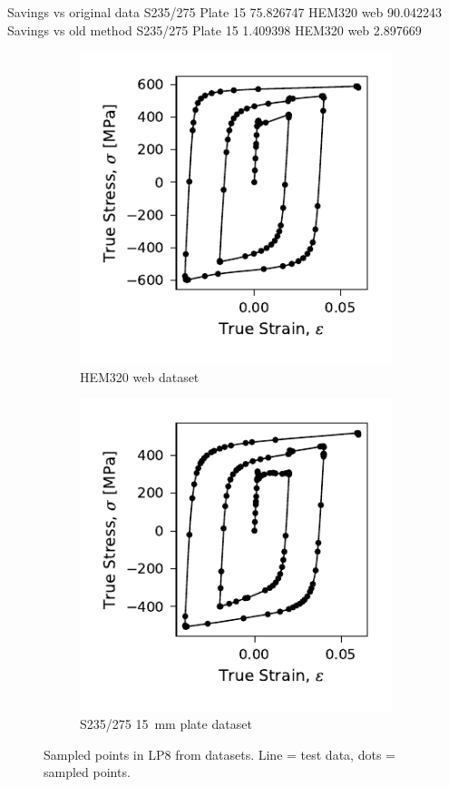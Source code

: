 \documentclass[a4paper,11pt]{article}
\begin{document}

Savings vs original data
S235/275 Plate 15       75.826747
HEM320 web    90.042243
Savings vs old method
S235/275 Plate 15       1.409398
HEM320 web    2.897669


\begin{figure}
    \centering
    \begin{subfigure}[b]{0.49\linewidth}
        \centering
        \includegraphics{LP8_dots_WP3_HEM320_C_CRM20.pdf}
        \caption{HEM320 web dataset}
        \label{fig:hem320-lp8-results}
    \end{subfigure}
    \begin{subfigure}[b]{0.49\linewidth}
        \centering
        \includegraphics{LP8_dots_S235275_Plate15.pdf}
        \caption{S235/275 15~mm plate dataset}
        \label{fig:s235275-lp8-results}
    \end{subfigure}
    \caption{Sampled points in LP8 from datasets. Line = test data, dots = sampled points.}
\end{figure}
\end{document}

